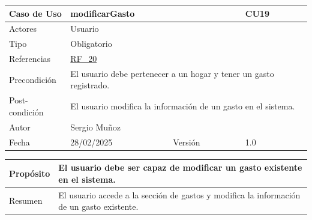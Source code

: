 \newpage

\begin{table}[H]
    \centering
    \begin{tabular}{| m{} | m{} | m{} | m{} |}
        \hline
        \rowcolor[HTML]{C0C0C0} Caso de Uso & \multicolumn{2}{|m{0.43\textwidth}|}{modificarGasto} &  CU19\\ 
        \hline
        Actores & \multicolumn{3}{l|}{Usuario} \\ 
        \hline
        Tipo & \multicolumn{3}{l|}{Obligatorio} \\ 
        \hline
        Referencias & \multicolumn{3}{l|}{\hyperref[req:RF20]{RF\_20}} \\ 
        \hline
        Precondición & \multicolumn{3}{m{0.67\textwidth}|}{El usuario debe pertenecer a un hogar y tener un gasto registrado.} \\ 
        \hline
        Post-condición & \multicolumn{3}{m{0.67\textwidth}|}{El usuario modifica la información de un gasto en el sistema.} \\ 
        \hline
        Autor & \multicolumn{3}{l|}{Sergio Muñoz} \\ 
        \hline
        Fecha & 28/02/2025 & Versión & 1.0 \\ 
        \hline
    \end{tabular}
\end{table}

\begin{table}[H]
    \centering
    \begin{tabular}{| m{} | m{} | m{} | m{} |}
        \hline
        Propósito & \multicolumn{3}{m{0.67\textwidth}|}{El usuario debe ser capaz de modificar un gasto existente en el sistema.} \\ 
        \hline
        Resumen & \multicolumn{3}{m{0.67\textwidth}|}{El usuario accede a la sección de gastos y modifica la información de un gasto existente.} \\ 
        \hline
    \end{tabular}
\end{table}


